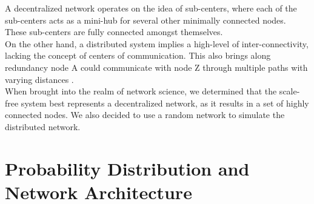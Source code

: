 \documentclass[journal]{IEEEtran}
\begin{document}
\noindent A decentralized network operates on the idea of sub-centers, where each of the sub-centers acts as a mini-hub for several other minimally connected nodes. These sub-centers are fully connected amongst themselves. \\

\noindent On the other hand, a distributed system implies a high-level of inter-connectivity, lacking the concept of centers of communication. This also brings along redundancy \emdash node A could communicate with node Z through multiple paths with varying distances \cite{Network_Structure_2017}. \\

\noindent When brought into the realm of network science, we determined that the scale-free system best represents a decentralized network, as it results in a set of highly connected nodes. We also decided to use a random network to simulate the distributed network. 








\begin{figure}[!ht]
\end{figure}

\section{Probability Distribution and Network Architecture}
\end{document}
